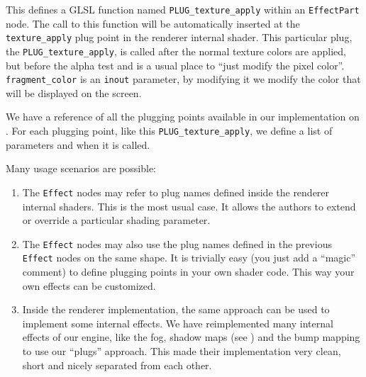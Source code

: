 \documentclass{egpubl}
\begin{document}
This defines a GLSL function named \texttt{PLUG\_texture\_apply}
within an \texttt{EffectPart} node. The call to this function will
be automatically inserted at the \texttt{texture\_apply} plug point in
the renderer internal shader. This particular plug,
the \texttt{PLUG\_texture\_apply}, is called after the normal texture colors
are applied, but before the alpha test and is a usual place to ``just modify the pixel color''.
\texttt{fragment\_color} is an \texttt{inout} parameter, by modifying it
we modify the color that will be displayed on the screen.

We have a reference of all the plugging points available in our implementation
on .
For each plugging point,
like this \texttt{PLUG\_texture\_apply}, we define a list of parameters
and when it is called.

\needspace{1in}
Many usage scenarios are possible:

\begin{enumerate}

\item The \texttt{Effect} nodes may refer to plug names
defined inside the renderer internal shaders. This is the most usual case.
It allows the authors to extend or override a particular shading parameter.

\item The \texttt{Effect} nodes may also use the plug names defined
in the previous \texttt{Effect} nodes on the same shape.
It is trivially easy (you just add a ``magic'' comment) to define
plugging points in your own shader code. This way your own effects
can be customized.

\item Inside the renderer implementation, the same approach can be used
to implement some internal effects.
We have reimplemented many internal effects of our engine,
like the fog, shadow maps (see \cite{vrmleng:shadowmaps})
and the bump mapping to use our ``plugs'' approach.
This made their implementation very clean, short
and nicely separated from each other.



\end{enumerate}
\end{document}
